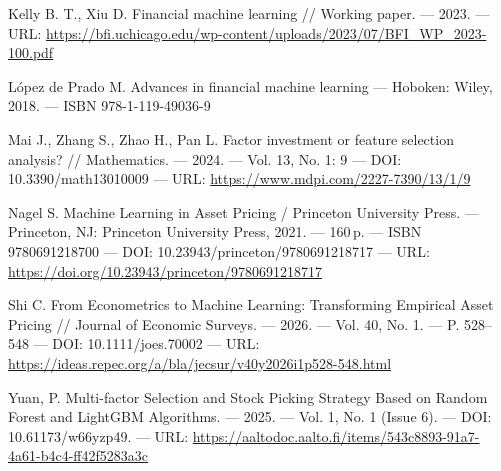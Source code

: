 \documentclass[
]{article}
\begin{document}
{  Kelly B. T., Xiu D. Financial machine learning // Working paper. --- 2023. --- URL: \url{https://bfi.uchicago.edu/wp-content/uploads/2023/07/BFI_WP_2023-100.pdf}

  López de Prado M. Advances in financial machine learning --- Hoboken: Wiley, 2018. --- ISBN 978-1-119-49036-9

  Mai J., Zhang S., Zhao H., Pan L. Factor investment or feature selection analysis? // Mathematics. --- 2024. --- Vol. 13, No. 1: 9 --- DOI: 10.3390/math13010009 --- URL: \url{https://www.mdpi.com/2227-7390/13/1/9}

  Nagel S. Machine Learning in Asset Pricing / Princeton University Press. --- Princeton, NJ: Princeton University Press, 2021. --- 160\,p. --- ISBN 9780691218700 --- DOI: 10.23943/princeton/9780691218717 --- URL: \url{https://doi.org/10.23943/princeton/9780691218717}

  Shi C. From Econometrics to Machine Learning: Transforming Empirical Asset Pricing // Journal of Economic Surveys. --- 2026. --- Vol. 40, No. 1. --- P. 528--548 --- DOI: 10.1111/joes.70002 --- URL: \url{https://ideas.repec.org/a/bla/jecsur/v40y2026i1p528-548.html}

  Yuan, P. Multi-factor Selection and Stock Picking Strategy Based on Random Forest and LightGBM Algorithms. --- 2025. --- Vol. 1, No. 1 (Issue 6). --- DOI: 10.61173/w66yzp49. --- URL: \url{https://aaltodoc.aalto.fi/items/543c8893-91a7-4a61-b4c4-ff42f5283a3c}}
\end{document}
